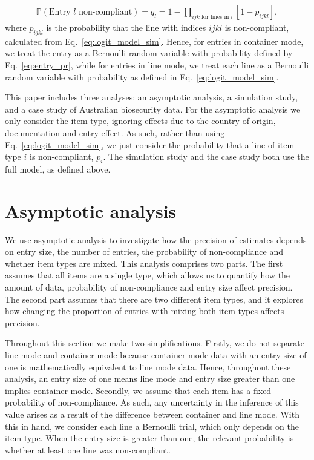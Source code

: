 \documentclass[aoas]{imsart}
\begin{document}
\begin{align}
\mathbb{P}\left(\text{Entry } l \text{ non-compliant}\right) = q_l = 1-\prod_{ijk \text{ for lines in }l}[1-p_{ijkl}],\label{eq:entry_pr}
\end{align}
where  {$p_{ijkl}$ is the probability that the line with indices $ijkl$} is non-compliant, calculated from Eq.~\eqref{eq:logit_model_sim}.
Hence, for entries in container mode, we treat the entry  as a Bernoulli random variable with probability defined by Eq.~\eqref{eq:entry_pr}, while for entries in line mode, we treat each line as a Bernoulli random variable with probability as defined in Eq.~\eqref{eq:logit_model_sim}.


This paper includes three analyses: an asymptotic analysis,
 a simulation study, and a case study of Australian biosecurity data.  {For the asymptotic analysis we only consider the item type, ignoring effects due to the country of origin, documentation and entry effect. As such,} rather than using Eq.~\eqref{eq:logit_model_sim}, we just consider the probability that a line of item type \(i\) is non-compliant, \(p_i\). The simulation study and the case study both use the full model, as defined above. 

\section{Asymptotic analysis}\label{sec:asymptotic_analysis}
We use asymptotic analysis to investigate how the precision of estimates depends on entry size, the number of entries, the probability of non-compliance and whether item types are mixed. This analysis comprises two parts. The first assumes that all items are a single type, which allows us to quantify how the amount of data, probability of non-compliance  and entry size affect precision. The second part assumes that there are two different item types, and it explores how changing the proportion of entries with {mixing both item types} affects precision.

Throughout this section we make two simplifications. Firstly, we do not separate line mode and container mode because container mode data with an entry size of one is mathematically equivalent to line mode data. Hence, throughout these analysis, an entry size of one means line mode and entry size greater than one implies container mode. Secondly, we  assume that each item has a fixed probability of non-compliance.  {As such, any uncertainty in the inference of this value arises as a result of the difference between container and line mode. With this in hand,} we consider each line a Bernoulli trial, which only depends on the item type. When the entry size is greater than one, the relevant probability is whether at least one line was  {non-compliant.}
\end{document}
